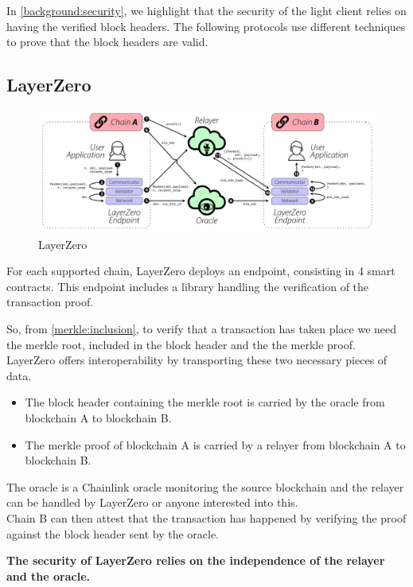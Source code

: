 In \ref{background:security}, we highlight that the security of the light client relies on having the verified block headers. The following protocols use different techniques to prove that the block headers are valid. 

\subsection{LayerZero \cite{zarick2021layerzero}}
\begin{figure}[H]
    \centering
\includegraphics[width=1.\linewidth]{interoperability/layerZero.png}
    \caption{LayerZero}
    \label{fig:layer_zero}
\end{figure}

For each supported chain, LayerZero deploys an endpoint, consisting in 4 smart contracts. This endpoint includes a library handling the verification of the transaction proof.

So, from \ref{merkle:inclusion},  to verify that a transaction has taken place we need the merkle root, included in the block header and the the merkle proof. 
\\
LayerZero offers interoperability by transporting these two necessary pieces of data.
\begin{itemize}
    \item The block header containing the merkle root is carried by the oracle from blockchain A to blockchain B. 
    \item The merkle proof of blockchain A is carried by a relayer from blockchain A to blockchain B.
\end{itemize}

The oracle is a Chainlink oracle monitoring the source blockchain and the relayer can be handled by LayerZero or anyone interested into this. 
\\
Chain B can then attest that the transaction has happened by verifying the proof against the block header sent by the oracle.

\textbf{The security of LayerZero relies on the independence of the relayer and the oracle.}

